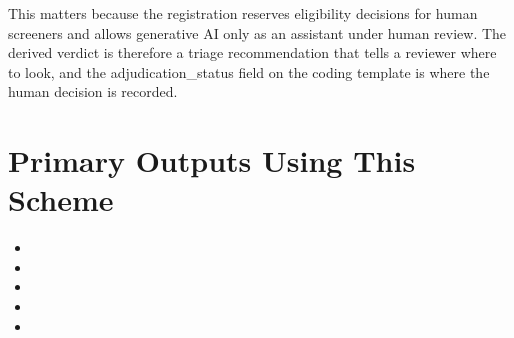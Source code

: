 \documentclass[11pt]{article}
\begin{document}
This matters because the registration reserves eligibility decisions for human screeners and allows generative AI only as an assistant under human review. The derived verdict is therefore a triage recommendation that tells a reviewer where to look, and the adjudication\_status field on the coding template is where the human decision is recorded.


\section*{Primary Outputs Using This Scheme}
\begin{itemize}
\item {}
\item {}
\item {}
\item {}
\item {}
\end{itemize}
\end{document}
